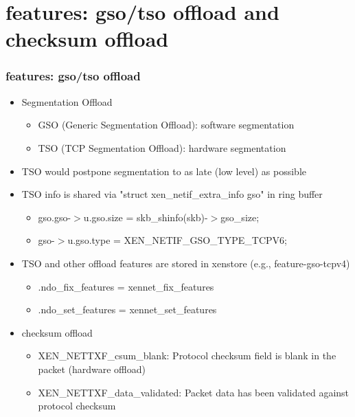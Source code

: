 \documentclass[aspectratio=169]{beamer}
\begin{document}
\section{features: gso/tso offload and checksum offload}
\begin{frame}
\frametitle{features: gso/tso offload}
\begin{itemize}
\item {\large Segmentation Offload}
	\begin{itemize}
		\item GSO (Generic Segmentation Offload): software segmentation
		\item TSO (TCP Segmentation Offload): hardware segmentation
	\end{itemize} \pause
\item {\large TSO would postpone segmentation to as late (low level) as possible} \pause
\item {\large TSO info is shared via "struct xen\_netif\_extra\_info gso" in ring buffer}
	\begin{itemize}
		\item gso.gso-$>$u.gso.size = skb\_shinfo(skb)-$>$gso\_size;
		\item gso-$>$u.gso.type = XEN\_NETIF\_GSO\_TYPE\_TCPV6;
	\end{itemize} \pause
\item {\large TSO and other offload features are stored in xenstore (e.g., feature-gso-tcpv4)}
	\begin{itemize}
		\item .ndo\_fix\_features = xennet\_fix\_features
		\item .ndo\_set\_features = xennet\_set\_features
	\end{itemize} \pause
\item {\large checksum offload}
	\begin{itemize}
		\item XEN\_NETTXF\_csum\_blank: Protocol checksum field is blank in the packet (hardware offload)
		\item XEN\_NETTXF\_data\_validated: Packet data has been validated against protocol checksum
	\end{itemize}
\end{itemize}
\end{frame}

\end{document}
